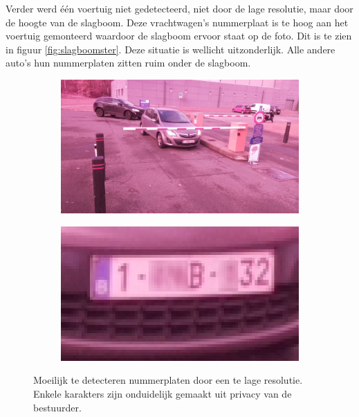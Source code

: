 Verder werd één voertuig niet gedetecteerd, niet door de lage resolutie, maar door de hoogte van de slagboom. Deze vrachtwagen's nummerplaat is te hoog aan het voertuig gemonteerd waardoor de slagboom ervoor staat op de foto. Dit is te zien in figuur \ref{fig:slagboomster}. Deze situatie is wellicht uitzonderlijk. Alle andere auto's hun nummerplaten zitten ruim onder de slagboom.

\begin{figure}[h!]
	\centering
	\begin{subfigure}[b]{0.49\linewidth}
		\includegraphics[width=\linewidth]{img/sterachter/sterachter1.jpg}
	\end{subfigure}
	\begin{subfigure}[b]{0.49\linewidth}
		\includegraphics[width=\linewidth]{img/sterachter/sterachter2.png}
	\end{subfigure}
	\caption{Moeilijk te detecteren nummerplaten door een te lage resolutie. Enkele karakters zijn onduidelijk gemaakt uit privacy van de bestuurder.}
	\label{fig:lowressterre}
\end{figure}

